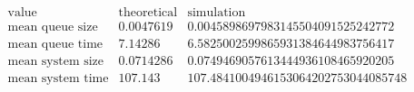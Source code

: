 \[\begin{array}{cccc}
 \text{value} & \text{theoretical} & \text{simulation} & \text{} \\
 \text{mean queue size} & 0.0047619 & 0.0045898697983145504091525242772 & \text{} \\
 \text{mean queue time} & 7.14286 & 6.5825002599865931384644983756417 & \text{} \\
 \text{mean system size} & 0.0714286 & 0.0749469057613444936108465920205 & \text{} \\
 \text{mean system time} & 107.143 & 107.4841004946153064202753044085748 & \text{} \\
\end{array}\]

